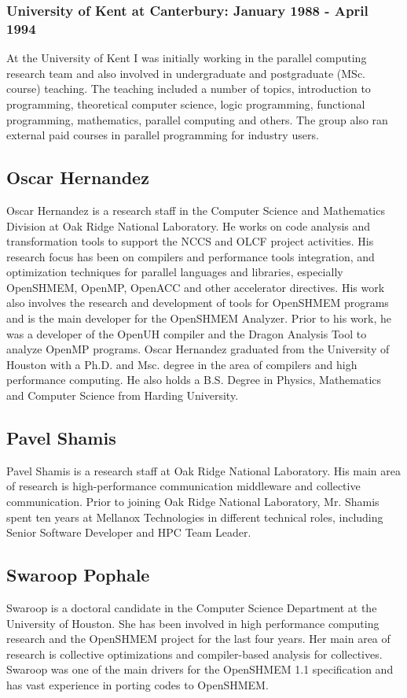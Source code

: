\documentclass[10pt,english]{article}
\begin{document}
\subsubsection*{University of Kent at Canterbury:
  January 1988 - April 1994}

    At the University of Kent I was initially working in the parallel
    computing research team and also involved in undergraduate and
    postgraduate (MSc. course) teaching. The teaching included a
    number of topics, introduction to programming, theoretical
    computer science, logic programming, functional programming,
    mathematics, parallel computing and others.  The group also ran
    external paid courses in parallel programming for industry users.

\subsection{Oscar Hernandez}

Oscar Hernandez is a research staff in the Computer Science and Mathematics Division at Oak Ridge National Laboratory. He works on code analysis and transformation tools to support the NCCS and OLCF project activities. His research focus has been on compilers and performance tools integration, and optimization techniques for parallel languages and libraries, especially OpenSHMEM, OpenMP, OpenACC and other accelerator directives. His work also involves the research and development of tools for OpenSHMEM programs and is the main developer for the OpenSHMEM Analyzer. Prior to his work, he was a developer of the OpenUH compiler and the Dragon Analysis Tool to analyze OpenMP programs. Oscar Hernandez graduated from the University of Houston with a Ph.D. and Msc. degree in the area of compilers and high performance computing. He also holds a B.S. Degree in Physics, Mathematics and Computer Science from Harding University.

\subsection{Pavel Shamis}

Pavel Shamis is a research staff at Oak Ridge National Laboratory. His main area of research is high-performance communication middleware and collective communication. Prior to  joining Oak Ridge National Laboratory, Mr. Shamis spent ten years at Mellanox Technologies in different technical roles, including Senior Software Developer and HPC Team Leader. 

\subsection{Swaroop Pophale}
Swaroop is a doctoral candidate in the Computer Science Department at the University of Houston. She has 
been involved in high performance computing research and the OpenSHMEM project for the last four years. Her main
area of research is collective optimizations and compiler-based analysis for collectives. Swaroop was one of the main
drivers for the OpenSHMEM 1.1 specification and has vast experience in porting codes to OpenSHMEM.
\end{document}
